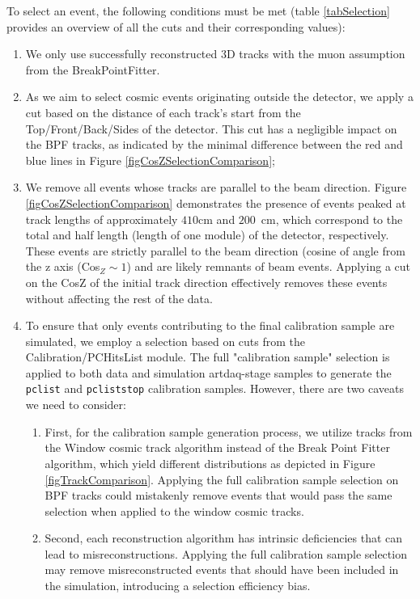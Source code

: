 \documentclass[12pt]{article}
\begin{document}
To select an event, the following conditions must be met (table \ref{tabSelection} provides an overview of all the cuts and their corresponding values):
\begin{enumerate}
\item We only use successfully reconstructed 3D tracks with the muon assumption from the BreakPointFitter.
\item As we aim to select cosmic events originating outside the detector, we apply a cut based on the distance of each track's start from the Top/Front/Back/Sides of the detector. This cut has a negligible impact on the BPF tracks, as indicated by the minimal difference between the red and blue lines in Figure \ref{figCosZSelectionComparison};
\item We remove all events whose tracks are parallel to the beam direction. Figure \ref{figCosZSelectionComparison} demonstrates the presence of events peaked at track lengths of approximately $410$cm and $200$~cm, which correspond to the total and half length (length of one module) of the detector, respectively. These events are strictly parallel to the beam direction (cosine of angle from the z axis (Cos$_Z\sim 1$) and are likely remnants of beam events. Applying a cut on the CosZ of the initial track direction effectively removes these events without affecting the rest of the data.
\item To ensure that only events contributing to the final calibration sample are simulated, we employ a selection based on cuts from the Calibration/PCHitsList module. The full "calibration sample" selection is applied to both data and simulation artdaq-stage samples to generate the \texttt{pclist} and \texttt{pcliststop} calibration samples. However, there are two caveats we need to consider:
\begin{enumerate}
\item First, for the calibration sample generation process, we utilize tracks from the Window cosmic track algorithm instead of the Break Point Fitter algorithm, which yield different distributions as depicted in Figure \ref{figTrackComparison}. Applying the full calibration sample selection on BPF tracks could mistakenly remove events that would pass the same selection when applied to the window cosmic tracks.
\item Second, each reconstruction algorithm has intrinsic deficiencies that can lead to misreconstructions. Applying the full calibration sample selection may remove misreconstructed events that should have been included in the simulation, introducing a selection efficiency bias.
\end{enumerate}


\end{enumerate}
\end{document}
